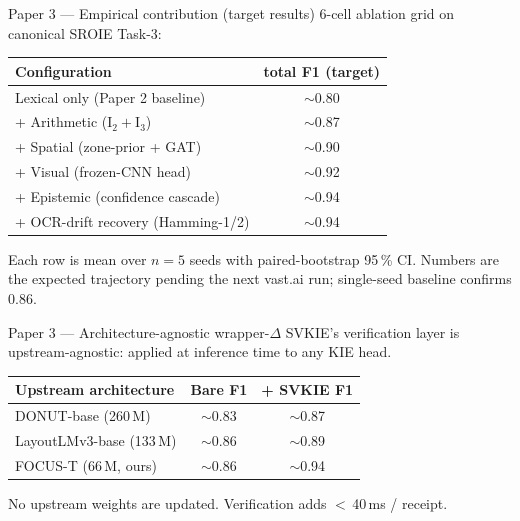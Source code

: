 \documentclass{beamer}
\begin{document}
\begin{frame}{Paper 3 --- Empirical contribution (target results)}
  6-cell ablation grid on canonical SROIE Task-3:
  \vspace{0.5em}
  \small
  \begin{tabular}{lc}
    \toprule
    Configuration & \textsf{total} F1 (target) \\ \midrule
    Lexical only (Paper 2 baseline)              & $\sim$0.80 \\
    + Arithmetic ($\mathrm{I}_2 + \mathrm{I}_3$) & $\sim$0.87 \\
    + Spatial (zone-prior + GAT)                 & $\sim$0.90 \\
    + Visual (frozen-CNN head)                   & $\sim$0.92 \\
    + Epistemic (confidence cascade)             & $\sim$0.94 \\
    + OCR-drift recovery (Hamming-1/2)           & $\sim$0.94 \\
    \bottomrule
  \end{tabular}
  \vspace{0.5em}
  \footnotesize
  Each row is mean over $n=5$ seeds with paired-bootstrap 95\,\% CI.
  Numbers are the expected trajectory pending the next vast.ai run;
  single-seed baseline confirms 0.86.
\end{frame}

\begin{frame}{Paper 3 --- Architecture-agnostic wrapper-$\Delta$}
  SVKIE's verification layer is upstream-agnostic: applied at inference
  time to any KIE head.
  \vspace{0.5em}
  \small
  \begin{tabular}{lcc}
    \toprule
    Upstream architecture & Bare F1 & + SVKIE F1 \\ \midrule
    DONUT-base (260\,M)         & $\sim$0.83 & $\sim$0.87 \\
    LayoutLMv3-base (133\,M)    & $\sim$0.86 & $\sim$0.89 \\
    FOCUS-T (66\,M, ours)       & $\sim$0.86 & $\sim$0.94 \\
    \bottomrule
  \end{tabular}
  \vspace{0.5em}
  No upstream weights are updated.  Verification adds
  $<$\,40\,ms / receipt.
\end{frame}
\end{document}
